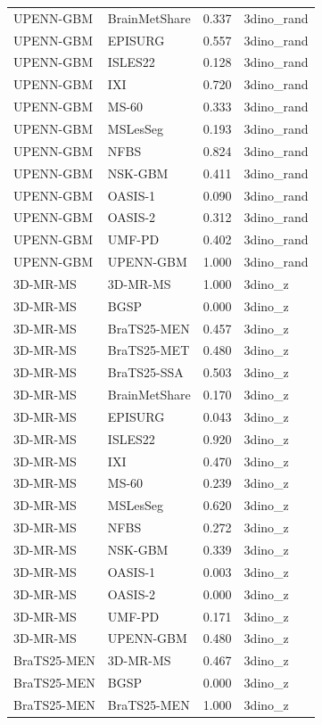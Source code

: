 \begin{tabular}{llrl}
UPENN-GBM & BrainMetShare & 0.337 & 3dino\_rand \\
UPENN-GBM & EPISURG & 0.557 & 3dino\_rand \\
UPENN-GBM & ISLES22 & 0.128 & 3dino\_rand \\
UPENN-GBM & IXI & 0.720 & 3dino\_rand \\
UPENN-GBM & MS-60 & 0.333 & 3dino\_rand \\
UPENN-GBM & MSLesSeg & 0.193 & 3dino\_rand \\
UPENN-GBM & NFBS & 0.824 & 3dino\_rand \\
UPENN-GBM & NSK-GBM & 0.411 & 3dino\_rand \\
UPENN-GBM & OASIS-1 & 0.090 & 3dino\_rand \\
UPENN-GBM & OASIS-2 & 0.312 & 3dino\_rand \\
UPENN-GBM & UMF-PD & 0.402 & 3dino\_rand \\
UPENN-GBM & UPENN-GBM & 1.000 & 3dino\_rand \\
3D-MR-MS & 3D-MR-MS & 1.000 & 3dino\_z \\
3D-MR-MS & BGSP & 0.000 & 3dino\_z \\
3D-MR-MS & BraTS25-MEN & 0.457 & 3dino\_z \\
3D-MR-MS & BraTS25-MET & 0.480 & 3dino\_z \\
3D-MR-MS & BraTS25-SSA & 0.503 & 3dino\_z \\
3D-MR-MS & BrainMetShare & 0.170 & 3dino\_z \\
3D-MR-MS & EPISURG & 0.043 & 3dino\_z \\
3D-MR-MS & ISLES22 & 0.920 & 3dino\_z \\
3D-MR-MS & IXI & 0.470 & 3dino\_z \\
3D-MR-MS & MS-60 & 0.239 & 3dino\_z \\
3D-MR-MS & MSLesSeg & 0.620 & 3dino\_z \\
3D-MR-MS & NFBS & 0.272 & 3dino\_z \\
3D-MR-MS & NSK-GBM & 0.339 & 3dino\_z \\
3D-MR-MS & OASIS-1 & 0.003 & 3dino\_z \\
3D-MR-MS & OASIS-2 & 0.000 & 3dino\_z \\
3D-MR-MS & UMF-PD & 0.171 & 3dino\_z \\
3D-MR-MS & UPENN-GBM & 0.480 & 3dino\_z \\
BraTS25-MEN & 3D-MR-MS & 0.467 & 3dino\_z \\
BraTS25-MEN & BGSP & 0.000 & 3dino\_z \\
BraTS25-MEN & BraTS25-MEN & 1.000 & 3dino\_z \\

\end{tabular}
